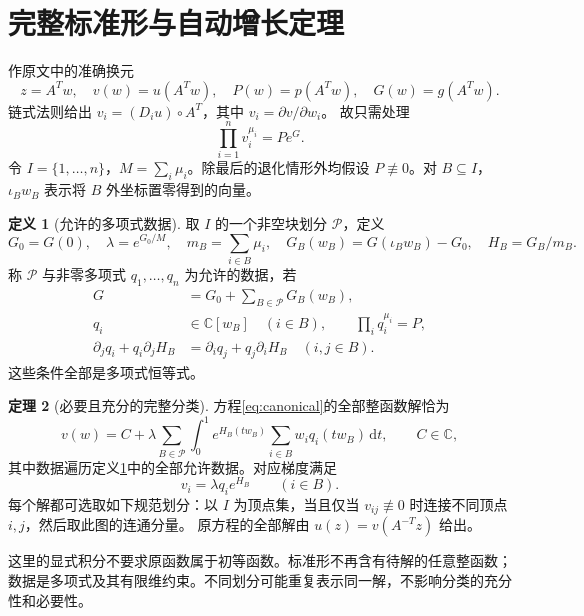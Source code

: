 \documentclass[UTF8,a4paper,zihao=-4,fontset=none]{ctexart}
\numberwithin{equation}{section}
\theoremstyle{definition}
\newtheorem{theorem}{定理}[section]
\theoremstyle{definition}\newtheorem{definition}[theorem]{定义}
\newcommand{\C}{\mathbb C}
\newcommand{\Pc}{\mathcal P}
\newcommand{\dd}{\,\mathrm d}
\begin{document}
\section{完整标准形与自动增长定理}
作原文中的准确换元
\begin{equation}\label{eq:change}
 z=A^Tw,\quad v(w)=u(A^Tw),\quad
 P(w)=p(A^Tw),\quad G(w)=g(A^Tw).
\end{equation}
链式法则给出 $v_i=(D_iu)\circ A^T$，其中 $v_i=\partial v/\partial w_i$。
故只需处理
\begin{equation}\label{eq:canonical}
 \prod_{i=1}^n v_i^{\mu_i}=P e^G.
\end{equation}
令 $I=\{1,\ldots,n\}$，$M=\sum_i\mu_i$。除最后的退化情形外均假设 $P\not\equiv0$。对 $B\subseteq I$，$\iota_Bw_B$ 表示将 $B$ 外坐标置零得到的向量。

\begin{definition}[允许的多项式数据]\label{def:data}
取 $I$ 的一个非空块划分 $\Pc$，定义
\[
 G_0=G(0),\quad \lambda=e^{G_0/M},\quad
 m_B=\sum_{i\in B}\mu_i,\quad
 G_B(w_B)=G(\iota_Bw_B)-G_0,\quad H_B=G_B/m_B.
\]
称 $\Pc$ 与非零多项式 $q_1,\ldots,q_n$ 为允许的数据，若
\begin{align}
 G&=G_0+\sum_{B\in\Pc}G_B(w_B),\label{eq:split}\\
 q_i&\in\C[w_B]\quad(i\in B),\qquad
 \prod_iq_i^{\mu_i}=P,\label{eq:product}\\
 \partial_jq_i+q_i\partial_jH_B
 &=\partial_iq_j+q_j\partial_iH_B\quad(i,j\in B).
 \label{eq:closure}
\end{align}
这些条件全部是多项式恒等式。
\end{definition}

\begin{theorem}[必要且充分的完整分类]\label{thm:normal}
方程\eqref{eq:canonical}的全部整函数解恰为
\begin{equation}\label{eq:solution}
 v(w)=C+\lambda\sum_{B\in\Pc}\int_0^1
 e^{H_B(tw_B)}\sum_{i\in B}w_iq_i(tw_B)\dd t,
 \qquad C\in\C,
\end{equation}
其中数据遍历定义\ref{def:data}中的全部允许数据。对应梯度满足
\begin{equation}\label{eq:gradient}
 v_i=\lambda q_i e^{H_B}\qquad(i\in B).
\end{equation}
每个解都可选取如下规范划分：以 $I$ 为顶点集，当且仅当 $v_{ij}\not\equiv0$ 时连接不同顶点 $i,j$，然后取此图的连通分量。
原方程的全部解由 $u(z)=v(A^{-T}z)$ 给出。
\end{theorem}
这里的显式积分不要求原函数属于初等函数。标准形不再含有待解的任意整函数；数据是多项式及其有限维约束。不同划分可能重复表示同一解，不影响分类的充分性和必要性。
\end{document}
